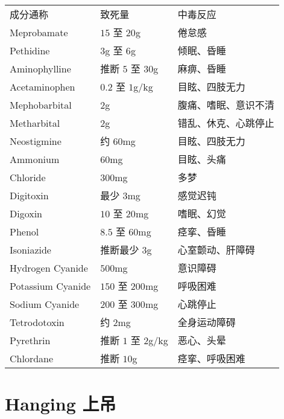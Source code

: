 \documentclass[UTF8]{ctexart}
\begin{document}
\begin{table}[]
\small
\begin{tabular}{lll}
成分通称              & 致死量                    & 中毒反应       \\
Meprobamate       & $15$ 至 $20$g & 倦怠感        \\
Pethidine         & $3$g 至 $6$g                 & 倾眠、昏睡      \\
Aminophylline     & 推断 $5$ 至 $30$g           & 麻痹、昏睡      \\
Acetaminophen     & $0.2$ 至 $1$g/kg          & 目眩、四肢无力    \\
Mephobarbital     & 2g                     & 腹痛、嗜眠、意识不清 \\
Metharbital       & 2g                     & 错乱、休克、心跳停止 \\
Neostigmine       & 约 $60$mg               & 目眩、四肢无力    \\
Ammonium          & $60$mg                 & 目眩、头痛      \\
Chloride          & $300$mg                & 多梦         \\
Digitoxin         & 最少 $3$mg               & 感觉迟钝       \\
Digoxin           & $10$ 至 $20$mg            & 嗜眠、幻觉      \\
Phenol            & $8.5$ 至 $60$mg           & 痉挛、昏睡      \\
Isoniazide        & 推断最少 $3$g              & 心室颤动、肝障碍   \\
Hydrogen Cyanide  & $500$mg                & 意识障碍       \\
Potassium Cyanide & $150$ 至 $200$mg          & 呼吸困难       \\
Sodium Cyanide    & $200$ 至 $300$mg          & 心跳停止       \\
Tetrodotoxin      & 约 $2$mg                & 全身运动障碍     \\
Pyrethrin         & 推断 $1$ 至 $2$g/kg         & 恶心、头晕      \\
Chlordane         & 推断 $10$g               & 痉挛、呼吸困难   
\end{tabular}
\end{table}

\newpage

\section{Hanging 上吊}
\end{document}

